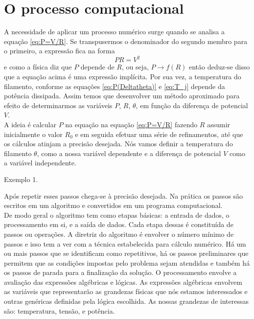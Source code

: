 \documentclass[12pt]{article}
\begin{document}
\section{O processo computacional}
A necessidade de aplicar um processo numérico surge quando se analisa a equação  \ref{eq:P=V/R}. Se transpusermos o denominador do segundo membro para o primeiro, a expressão fica na forma
\begin{equation}
    PR=V^2
\end{equation}
e como a física diz que $P$ depende de $R$, ou seja, $P\rightarrow f(R)$ então deduz-se disso que a equação acima é uma expressão implícita. Por sua vez, a temperatura do filamento, conforme as equações \ref{eq:P(Deltatheta)} e \ref{eq:T_j} depende da potência dissipada. Assim temos que desenvolver um método aproximado para efeito de determinarmos as variáveis $P$, $R$, $\theta$, em função da diferença de potencial $V$.\\
A ideia é calcular $P$ na equação na  equação  \ref{eq:P=V/R} fazendo $R$ assumir inicialmente o valor $R_0$ e em seguida efetuar uma série de refinamentos, até que os cálculos atinjam a precisão desejada. Nós vamos definir a temperatura do filamento $\theta$, como a nossa variável dependente e a diferença de potencial $V$ como a variável independente.
\begin{description}
\item[Exemplo 1.]

\end{description}

Após repetir esses passos chega-se à precisão desejada. Na prática os passos são escritos em um algoritmo e convertidos em um programa computacional.\\   
De modo geral o algoritmo tem como etapas básicas: a entrada de dados, o processamento em si, e a saída de dados. Cada etapa dessas é constituída de passos ou operações. A diretriz do algoritmo é envolver o número mínimo de passos e isso tem a ver com a técnica estabelecida para cálculo numérico. Há um ou mais passos que se identificam como repetitivos, há os passos preliminares que permitem que as condições  impostas pelo problema sejam atendidas e também há os passos de parada para a finalização da solução.
O processamento envolve a avaliação das expressões algébricas e lógicas. As expressões algébricas envolvem as variáveis que representarão as grandezas físicas que nós estamos interessados e outras genéricas definidas pela lógica escolhida. As nossas grandezas de interessas são: temperatura, tensão, e potência.
\end{document}
